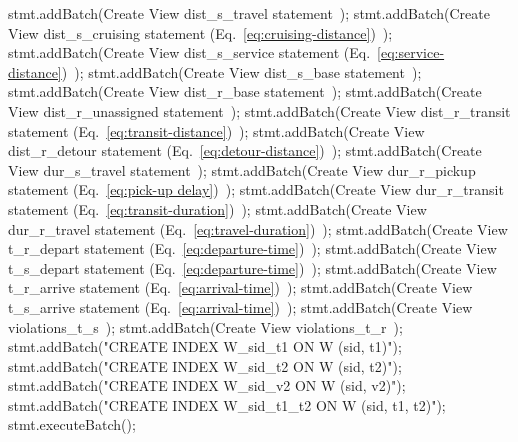     stmt.addBatch(\LA{}Create View dist\_s\_travel statement~{\nwtagstyle{}}\RA{});
    stmt.addBatch(\LA{}Create View dist\_s\_cruising statement (Eq.~\ref{eq:cruising-distance})~{\nwtagstyle{}}\RA{});
    stmt.addBatch(\LA{}Create View dist\_s\_service statement (Eq.~\ref{eq:service-distance})~{\nwtagstyle{}}\RA{});
    stmt.addBatch(\LA{}Create View dist\_s\_base statement~{\nwtagstyle{}}\RA{});
    stmt.addBatch(\LA{}Create View dist\_r\_base statement~{\nwtagstyle{}}\RA{});
    stmt.addBatch(\LA{}Create View dist\_r\_unassigned statement~{\nwtagstyle{}}\RA{});
    stmt.addBatch(\LA{}Create View dist\_r\_transit statement (Eq.~\ref{eq:transit-distance})~{\nwtagstyle{}}\RA{});
    stmt.addBatch(\LA{}Create View dist\_r\_detour statement (Eq.~\ref{eq:detour-distance})~{\nwtagstyle{}}\RA{});
    stmt.addBatch(\LA{}Create View dur\_s\_travel statement~{\nwtagstyle{}}\RA{});
    stmt.addBatch(\LA{}Create View dur\_r\_pickup statement (Eq.~\ref{eq:pick-up delay})~{\nwtagstyle{}}\RA{});
    stmt.addBatch(\LA{}Create View dur\_r\_transit statement (Eq.~\ref{eq:transit-duration})~{\nwtagstyle{}}\RA{});
    stmt.addBatch(\LA{}Create View dur\_r\_travel statement (Eq.~\ref{eq:travel-duration})~{\nwtagstyle{}}\RA{});
    stmt.addBatch(\LA{}Create View t\_r\_depart statement (Eq.~\ref{eq:departure-time})~{\nwtagstyle{}}\RA{});
    stmt.addBatch(\LA{}Create View t\_s\_depart statement (Eq.~\ref{eq:departure-time})~{\nwtagstyle{}}\RA{});
    stmt.addBatch(\LA{}Create View t\_r\_arrive statement (Eq.~\ref{eq:arrival-time})~{\nwtagstyle{}}\RA{});
    stmt.addBatch(\LA{}Create View t\_s\_arrive statement (Eq.~\ref{eq:arrival-time})~{\nwtagstyle{}}\RA{});
    stmt.addBatch(\LA{}Create View violations\_t\_s~{\nwtagstyle{}}\RA{});
    stmt.addBatch(\LA{}Create View violations\_t\_r~{\nwtagstyle{}}\RA{});
    stmt.addBatch("CREATE INDEX W_sid_t1 ON W (sid, t1)");
    stmt.addBatch("CREATE INDEX W_sid_t2 ON W (sid, t2)");
    stmt.addBatch("CREATE INDEX W_sid_v2 ON W (sid, v2)");
    stmt.addBatch("CREATE INDEX W_sid_t1_t2 ON W (sid, t1, t2)");
    stmt.executeBatch();
